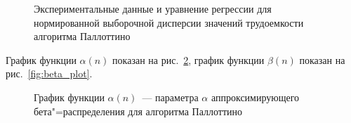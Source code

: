 \documentclass[a4paper, article, 14pt]{extarticle}
\begin{document}
\begin{figure}[h]
	\caption{Экспериментальные данные и уравнение регрессии для нормированной выборочной дисперсии значений трудоемкости алгоритма Паллоттино}
	\label{fig:regression_varience}
\end{figure}

График функции $\alpha(n)$ показан на рис.~\ref{fig:alpha_plot}, график функции $\beta(n)$ показан на рис.~\ref{fig:beta_plot}.

\begin{figure}[h]
	\caption{График функции $\alpha(n)$~--- параметра $\alpha$ аппроксимирующего бета"=распределения для алгоритма Паллоттино}
	\label{fig:alpha_plot}
\end{figure}
\end{document}
